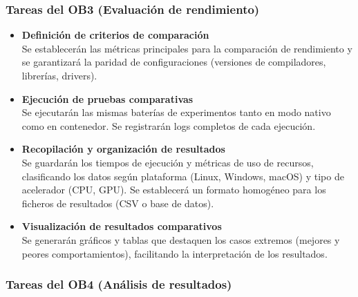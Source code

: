 \subsubsection{Tareas del OB3 (Evaluación de rendimiento)}\label{subsubsec:tareas_ob3}

\begin{itemize}
      \item \textbf{Definición de criterios de comparación} \\
            Se establecerán las métricas principales para la comparación de rendimiento y se garantizará la paridad de configuraciones (versiones de compiladores, librerías, drivers).

      \item \textbf{Ejecución de pruebas comparativas} \\
            Se ejecutarán las mismas baterías de experimentos tanto en modo nativo como en contenedor. Se registrarán logs completos de cada ejecución.

      \item \textbf{Recopilación y organización de resultados} \\
            Se guardarán los tiempos de ejecución y métricas de uso de recursos, clasificando los datos según plataforma (Linux, Windows, macOS) y tipo de acelerador (CPU, GPU). Se establecerá un formato homogéneo para los ficheros de resultados (CSV o base de datos).

      \item \textbf{Visualización de resultados comparativos} \\
            Se generarán gráficos y tablas que destaquen los casos extremos (mejores y peores comportamientos), facilitando la interpretación de los resultados.
\end{itemize}

\subsubsection{Tareas del OB4 (Análisis de resultados)}\label{subsubsec:tareas_ob4}

